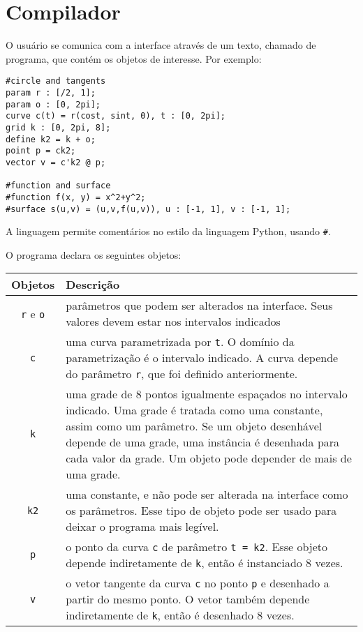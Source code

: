 \chapter{Compilador}
\label{compiler}

O usuário se comunica com a interface através de um texto, chamado de programa,
que contém os objetos de interesse.
Por exemplo:
\begin{lstlisting}[caption=Exemplo de objetos,label=code1]
#circle and tangents
param r : [/2, 1];
param o : [0, 2pi];
curve c(t) = r(cost, sint, 0), t : [0, 2pi];
grid k : [0, 2pi, 8];
define k2 = k + o;
point p = ck2;
vector v = c'k2 @ p;

#function and surface
#function f(x, y) = x^2+y^2;
#surface s(u,v) = (u,v,f(u,v)), u : [-1, 1], v : [-1, 1];
\end{lstlisting}

A linguagem permite comentários no estilo da linguagem Python, usando \texttt{\#}.

O programa declara os seguintes objetos:

\begin{centering}
\begin{tabularx}{\textwidth}{||c|X||}
    \cline{1-2}
    Objetos & Descrição \\ \hline \hline
    
    \texttt{r} e \texttt{o} & parâmetros que podem ser alterados na interface.
    Seus valores devem estar nos intervalos indicados \\ \hline
    
    \texttt{c} & uma curva parametrizada por \texttt{t}.
    O domínio da parametrização é o intervalo indicado.
    A curva depende do parâmetro \texttt{r}, que foi definido anteriormente. \\ \hline
    
    \texttt{k} & uma grade de 8 pontos igualmente espaçados no intervalo indicado.
    Uma grade é tratada como uma constante, assim como um parâmetro.
    Se um objeto desenhável depende de uma grade, uma instância é desenhada para cada valor da grade.
    Um objeto pode depender de mais de uma grade. \\ \hline
    
    \texttt{k2} & uma constante, e não pode ser alterada na interface como os parâmetros.
    Esse tipo de objeto pode ser usado para deixar o programa mais legível. \\ \hline
    
    \texttt{p} & o ponto da curva \texttt{c} de parâmetro \texttt{t = k2}.
    Esse objeto depende indiretamente de \texttt{k}, então é instanciado 8 vezes. \\ \hline
    
    \texttt{v} & o vetor tangente da curva \texttt{c} no ponto \texttt{p} 
    e desenhado a partir do mesmo ponto.
    O vetor também depende indiretamente de \texttt{k}, então é desenhado 8 vezes. \\ \hline
    \cline{1-2}
\end{tabularx}
\end{centering}

